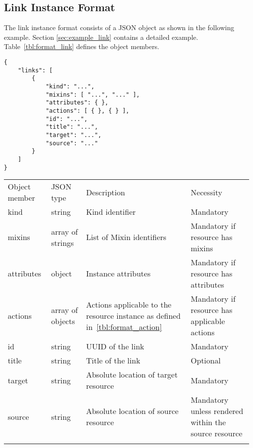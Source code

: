 \documentclass[10pt,a4paper]{article}
\begin{document}
\subsection{Link Instance Format}
\label{sec:format_link}

The link instance format consists of a JSON object as shown in the
following example. Section \ref{sec:example_link} contains a detailed example.
Table~\ref{tbl:format_link} defines the object members.
\begin{verbatim}
{
    "links": [
        {
            "kind": "...",
            "mixins": [ "...", "..." ],
            "attributes": { },
            "actions": [ { }, { } ],
            "id": "...",
            "title": "...",
            "target": "...",
            "source": "..."
        }
    ]
}
\end{verbatim}
 {
    \begin{tabular}{llp{5.0cm}p{3.0cm}}
    \toprule
    Object member & JSON type & Description & Necessity \\
    \colrule
    kind & string & Kind identifier & Mandatory \\

    mixins & array of strings & List of Mixin identifiers &
    Mandatory if resource has mixins \\

    attributes & object & Instance attributes & Mandatory if resource has attributes \\

    actions & array of objects & Actions applicable to the resource instance as defined in~\ref{tbl:format_action} &
    Mandatory if resource has applicable actions \\
    
    id & string & UUID of the link & Mandatory\\
        
    title & string & Title of the link & Optional\\
        
    target & string & Absolute location of target resource & Mandatory \\
    
    source & string & Absolute location of source resource & Mandatory unless rendered within the source resource\\
    \botrule
    \end{tabular}
}
\end{document}

